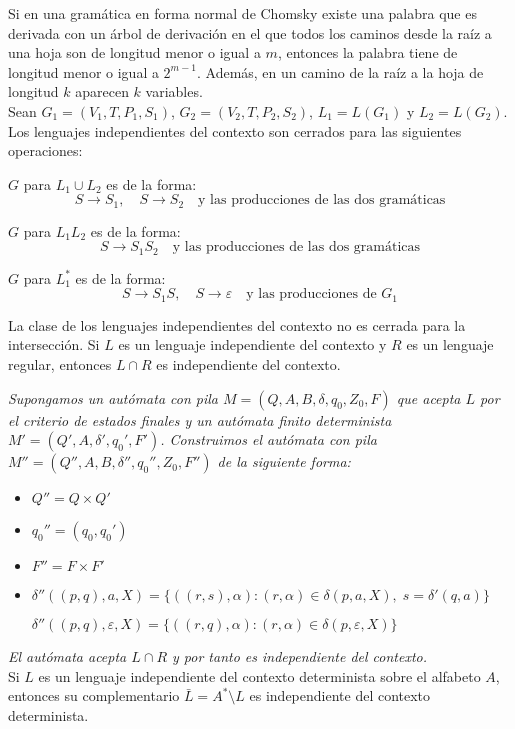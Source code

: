 \documentclass[11pt,titlepage,a4paper]{article}
\theoremstyle{ejemplo}
\theoremstyle{algoritmo}
\begin{document}
Si en una gramática en forma normal de Chomsky existe una palabra que es 
derivada con un árbol de derivación en el que todos los caminos desde la raíz a 
una hoja son de longitud menor o igual a $m$, entonces la palabra tiene de 
longitud menor o igual a $2^{m-1}$. Además, en un camino de la raíz a la hoja de 
longitud $k$ aparecen $k$ variables.
\\

Sean $G_1=(V_1,T,P_1,S_1)$, $G_2=(V_2,T,P_2,S_2)$, $L_1=L(G_1)$ y $L_2=L(G_2)$. 
Los lenguajes independientes del contexto son cerrados para las siguientes
operaciones:
\begin{description}[align=left,noitemsep]
	\item [Unión: ] $G$ para $L_1\cup L_2$ es de la forma:
	$$S\to S_1,\quad S\to S_2\quad\text{y las producciones de las dos 
	gramáticas}$$
	\item [Concatenación: ] $G$ para $L_1L_2$ es de la forma:
	$$S\to S_1S_2\quad\text{y las producciones de las dos gramáticas}$$
	\item [Clausura: ] $G$ para $L_1^*$ es de la forma:
	$$S\to S_1S,\quad S\to\varepsilon\quad\text{y las producciones de }G_1$$
\end{description}

La clase de los lenguajes independientes del contexto no es cerrada para la intersección. Si $L$ es un lenguaje independiente del contexto y $R$ es un 
lenguaje regular, entonces $L\cap R$ es independiente del contexto.

\emph{Supongamos un autómata con pila $M=(Q,A,B,\delta,q_0,Z_0,F)$ que acepta $L$ por el criterio de estados finales y un autómata finito determinista $M'=(Q',A,\delta',q_0',F')$. Construimos el autómata con pila $M''=(Q'',A,B,\delta'',q_0'',Z_0,F'')$ de la siguiente forma:}
\begin{itemize}[noitemsep]
	\item $Q''=Q\times Q'$
	\item $q_0''=(q_0,q_0')$
	\item $F''=F\times F'$
	\item $\delta''((p,q),a,X)=\{((r,s),\alpha):(r,\alpha)\in\delta(p,a,X),\;
	s=\delta'(q,a)\}$
	
	$\delta''((p,q),\varepsilon,X)=\{((r,q),\alpha):(r,\alpha)\in\delta(p,
	\varepsilon,X)\}$
\end{itemize}
\emph{El autómata acepta $L\cap R$ y por tanto es independiente del contexto.}
\\

Si $L$ es un lenguaje independiente del contexto determinista sobre el alfabeto 
$A$, entonces su complementario $\bar{L}=A^*\setminus L$ es independiente del
contexto determinista.
\end{document}
